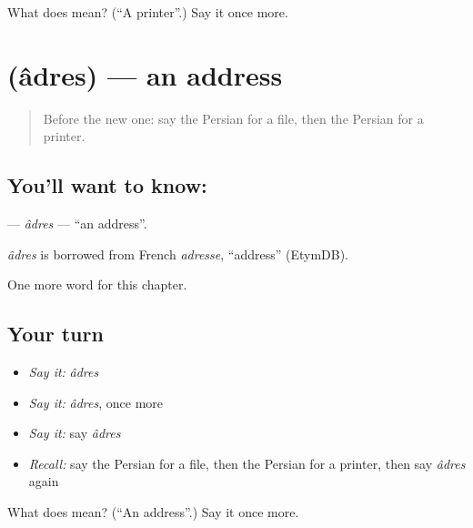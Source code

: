 \begin{tcolorbox}[breakable,colback=teal!4,colframe=teal!35!black,title={Before you move on}]
What does  mean? (\textquotedblleft{}A printer\textquotedblright{}.) Say it once more.
\end{tcolorbox}
\section[\texorpdfstring{\fa{آدرس} (âdres)}{آدرس (âdres)}]{ (âdres) — an address}

\label{lesson:FA-C206-adres}



\begin{quote}
Before the new one: say the Persian for a file, then the Persian for a printer.
\end{quote}

\subsection*{You'll want to know: }
\textbf{} — \emph{âdres} — \textquotedblleft{}an address\textquotedblright{}.

\begin{cousinweb}
\emph{âdres} is borrowed from French \emph{adresse}, \textquotedblleft{}address\textquotedblright{} (EtymDB).
\end{cousinweb}

\begin{grammarlens}[title={What you've built}]
One more word for this chapter.
\end{grammarlens}

\subsection*{Your turn}
\begin{itemize}
\raggedright
  \item \emph{Say it:} \emph{âdres}
  \item \emph{Say it:} \emph{âdres}, once more
  \item \emph{Say it:} say \emph{âdres}
  \item \emph{Recall:} say the Persian for a file, then the Persian for a printer, then say \emph{âdres} again
\end{itemize}

\begin{tcolorbox}[breakable,colback=teal!4,colframe=teal!35!black,title={Before you move on}]
What does  mean? (\textquotedblleft{}An address\textquotedblright{}.) Say it once more.
\end{tcolorbox}
